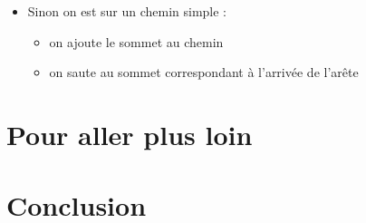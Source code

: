 \documentclass[a4paper,11pt]{article}
\begin{document}
\begin{itemize}
\begin{itemize}
\begin{itemize}
					\begin{itemize}
					\item le point d'arrivé du premier arc
					\item le point d'arrivé de l'arc suivant\footnote{Etant donné la structure des programmes il ne peut pas y avoir plus de 2 arcs.}
					\end{itemize}
				\item on ajoute la seconde liste à la fin de la première liste afin de regrouper tous les chemins
				\end{itemize}
			\end{itemize}
		\item Sinon on est sur un chemin simple :
			\begin{itemize}
			\item on ajoute le sommet au chemin
			\item on saute au sommet correspondant à l'arrivée de l'arête
			\end{itemize}
		\end{itemize}
	\section{Pour aller plus loin}
	\section{Conclusion}
\end{document}
